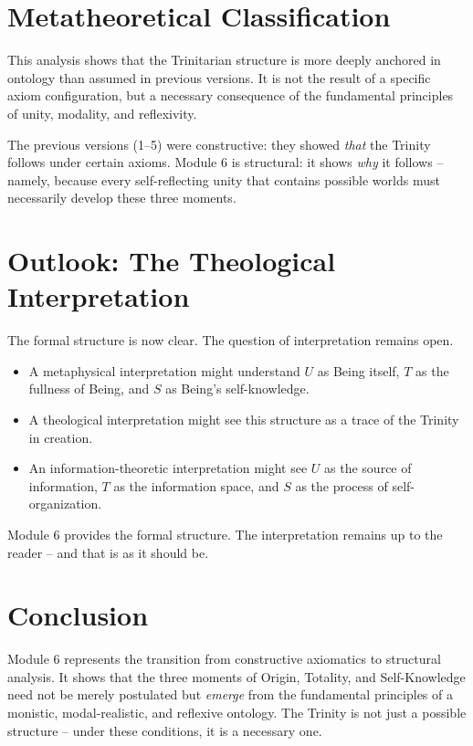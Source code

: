 \documentclass[12pt,a4paper]{article}
\begin{document}
\section{Metatheoretical Classification}

This analysis shows that the Trinitarian structure is more deeply anchored in ontology than assumed in previous versions. It is not the result of a specific axiom configuration, but a necessary consequence of the fundamental principles of unity, modality, and reflexivity.

The previous versions (1–5) were constructive: they showed \emph{that} the Trinity follows under certain axioms. Module 6 is structural: it shows \emph{why} it follows – namely, because every self-reflecting unity that contains possible worlds must necessarily develop these three moments.

\section{Outlook: The Theological Interpretation}

The formal structure is now clear. The question of interpretation remains open.

\begin{itemize}
\item A metaphysical interpretation might understand \(U\) as Being itself, \(T\) as the fullness of Being, and \(S\) as Being's self-knowledge.
\item A theological interpretation might see this structure as a trace of the Trinity in creation.
\item An information-theoretic interpretation might see \(U\) as the source of information, \(T\) as the information space, and \(S\) as the process of self-organization.
\end{itemize}

Module 6 provides the formal structure. The interpretation remains up to the reader – and that is as it should be.

\section{Conclusion}

Module 6 represents the transition from constructive axiomatics to structural analysis. It shows that the three moments of Origin, Totality, and Self-Knowledge need not be merely postulated but \emph{emerge} from the fundamental principles of a monistic, modal-realistic, and reflexive ontology. The Trinity is not just a possible structure – under these conditions, it is a necessary one.
\end{document}
